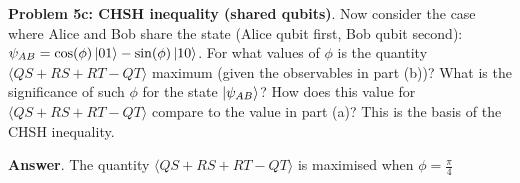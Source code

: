 \textbf{Problem 5c: CHSH inequality (shared qubits)}. Now consider the case where Alice and Bob share the state (Alice qubit first, Bob qubit second): $\psi_{AB} = \cos(\phi)\ket{01} - \sin(\phi)\ket{10}$. 
For what values of $\phi$ is the quantity $\langle QS + RS + RT - QT\rangle$ maximum (given the observables in part (b))? 
What is the significance of such $\phi$ for the state $\ket{\psi_{AB}}$? 
How does this value for $\langle QS + RS + RT - QT\rangle$ compare to the value in part (a)? 
This is the basis of the CHSH inequality.


\textbf{Answer}. The quantity $\langle QS + RS + RT - QT\rangle$ is maximised when $\phi = \frac{\pi}{4}$


